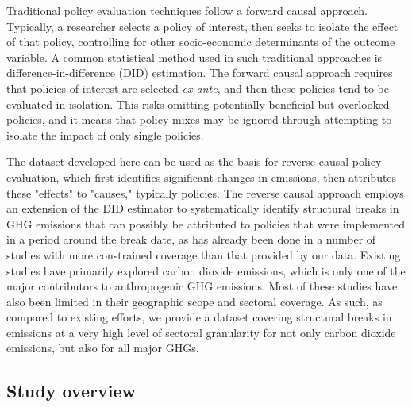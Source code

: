 \documentclass[a4paper]{article}
\begin{document}
Traditional policy evaluation techniques follow a forward causal approach. Typically, a researcher selects a policy of interest, then seeks to isolate the effect of that policy, controlling for other socio-economic determinants of the outcome variable. A common statistical method used in such traditional approaches is difference-in-difference (DID) estimation. The forward causal approach requires that policies of interest are selected \textit{ex ante}, and then these policies tend to be evaluated in isolation. This risks omitting potentially beneficial but overlooked policies, and it means that policy mixes may be ignored through attempting to isolate the impact of only single policies.

The dataset developed here can be used as the basis for reverse causal policy evaluation, which first identifies significant changes in emissions, then attributes these "effects" to "causes," typically policies. \cite{gelman2013ask} The reverse causal approach employs an extension of the DID estimator to systematically identify structural breaks in GHG emissions that can possibly be attributed to policies that were implemented in a period around the break date, as has already been done in a number of studies with more constrained coverage than that provided by our data. \cite{tebecis2023climate,koch2022attributing, yao2022structural, stechemesser2024climate} Existing studies have primarily explored carbon dioxide emissions, which is only one of the major contributors to anthropogenic GHG emissions. Most of these studies have also been limited in their geographic scope and sectoral coverage. As such, as compared to existing efforts, \cite{stechemesser2024climate} we provide a dataset covering structural breaks in emissions at a very high level of sectoral granularity for not only carbon dioxide emissions, but also for all major GHGs.

\subsection*{Study overview}
\end{document}
